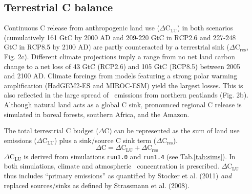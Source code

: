 \documentclass{myreport}
\begin{document}
\subsection{Terrestrial C balance}
\label{sec:dC}





Continuous C release from anthropogenic land use ($\Delta$C$_{\mathrm{LU}}$) in both scenarios (cumulatively 161 GtC by 2000 AD and 209-220 GtC in RCP2.6 and 227-248 GtC in RCP8.5 by 2100 AD) are partly counteracted by a terrestrial sink ($\Delta$C$_{\mathrm{res}}$, Fig. 2c). Different climate projections imply a range from no net land carbon change to a net loss of 43 GtC (RCP2.6) and 105 GtC (RCP8.5) between 2005 and 2100 AD. Climate forcings from models featuring a strong polar warming amplification (HadGEM2-ES and MIROC-ESM) yield the largest losses. This is also reflected in the large spread of \chh\ emissions from northern peatlands (Fig. 2b). Although natural land acts as a global C sink, pronounced regional C release is simulated in boreal forests, southern Africa, and the Amazon.


The total terrestrial C budget ($\Delta \mathrm{C}$) can be represented as the sum of land use emissions ($\Delta \mathrm{C}_{\mathrm{LU}}$) plus a sink/source C sink term ($\Delta \mathrm{C}_{\mathrm{res}}$).
\begin{equation}
\Delta \mathrm{C} = \Delta \mathrm{C}_{\mathrm{LU}} + \Delta \mathrm{C}_{\mathrm{res}}
\label{eq:dC}
\end{equation}
$\Delta \mathrm{\mathrm{C}}_{\mathrm{LU}}$ is derived from simulations {\tt run1.0} and {\tt run1.4} (see Tab.\ref{tab:sims}). In both simulations, climate and atmospheric \coo\ concentration is prescribed. $\Delta \mathrm{\mathrm{C}}_{\mathrm{LU}}$ thus includes ``primary emissions'' as quantified by Stocker et al. (2011)\cite{stocker11bg} {\it and} replaced sources/sinks as defined by Strassmann et al. (2008)\cite{strassmann08tel}. 
\end{document}

